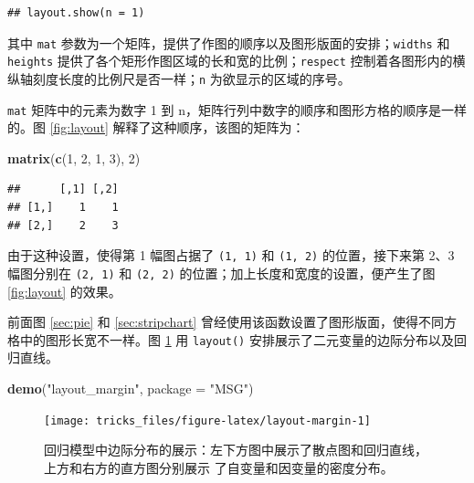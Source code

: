 \documentclass[
  b5paper,
  UTF8,twoside]{book}
\newenvironment{Shaded}{\begin{snugshade}}{\end{snugshade}}
\newcommand{\AttributeTok}[1]{\textcolor[rgb]{0.13,0.29,0.53}{#1}}
\newcommand{\DecValTok}[1]{\textcolor[rgb]{0.00,0.00,0.81}{#1}}
\newcommand{\FunctionTok}[1]{\textcolor[rgb]{0.13,0.29,0.53}{\textbf{#1}}}
\newcommand{\NormalTok}[1]{#1}
\newcommand{\StringTok}[1]{\textcolor[rgb]{0.31,0.60,0.02}{#1}}
\begin{document}
\begin{verbatim}
## layout.show(n = 1)
\end{verbatim}

其中 \texttt{mat} 参数为一个矩阵，提供了作图的顺序以及图形版面的安排；\texttt{widths} 和 \texttt{heights} 提供了各个矩形作图区域的长和宽的比例；\texttt{respect} 控制着各图形内的横纵轴刻度长度的比例尺是否一样；\texttt{n} 为欲显示的区域的序号。

\texttt{mat} 矩阵中的元素为数字 1 到 n，矩阵行列中数字的顺序和图形方格的顺序是一样的。图 \ref{fig:layout} 解释了这种顺序，该图的矩阵为：

\begin{Shaded}
\begin{Highlighting}[]
\FunctionTok{matrix}\NormalTok{(}\FunctionTok{c}\NormalTok{(}\DecValTok{1}\NormalTok{, }\DecValTok{2}\NormalTok{, }\DecValTok{1}\NormalTok{, }\DecValTok{3}\NormalTok{), }\DecValTok{2}\NormalTok{)}
\end{Highlighting}
\end{Shaded}

\begin{verbatim}
##      [,1] [,2]
## [1,]    1    1
## [2,]    2    3
\end{verbatim}

由于这种设置，使得第 1 幅图占据了 \texttt{(1,\ 1)} 和 \texttt{(1,\ 2)} 的位置，接下来第 2、3 幅图分别在 \texttt{(2,\ 1)} 和 \texttt{(2,\ 2)} 的位置；加上长度和宽度的设置，便产生了图 \ref{fig:layout} 的效果。

前面图 \ref{sec:pie} 和 \ref{sec:stripchart} 曾经使用该函数设置了图形版面，使得不同方格中的图形长宽不一样。图 \ref{fig:layout-margin} 用 \texttt{layout()} 安排展示了二元变量的边际分布以及回归直线。

\begin{Shaded}
\begin{Highlighting}[]
\FunctionTok{demo}\NormalTok{(}\StringTok{"layout\_margin"}\NormalTok{, }\AttributeTok{package =} \StringTok{"MSG"}\NormalTok{)}
\end{Highlighting}
\end{Shaded}

\begin{figure}

{\centering \texttt{[image: tricks\_files/figure-latex/layout-margin-1]} 

}

\caption[ 回归模型中边际分布的展示 ]{回归模型中边际分布的展示：左下方图中展示了散点图和回归直线，上方和右方的直方图分别展示 了自变量和因变量的密度分布。}\label{fig:layout-margin}
\end{figure}
\end{document}
